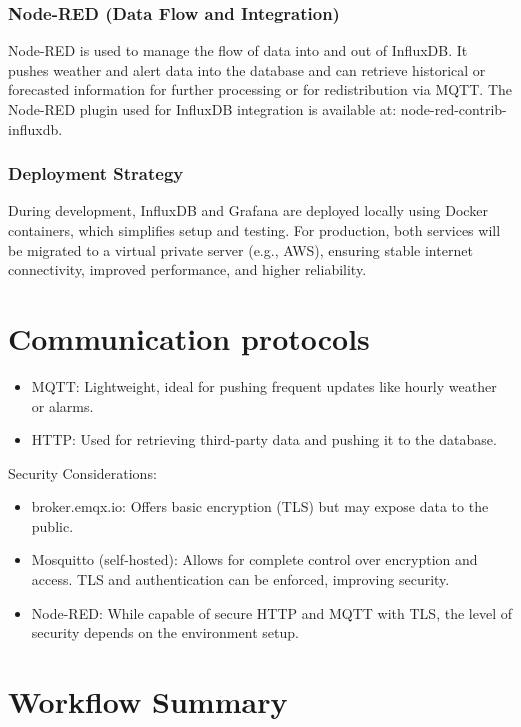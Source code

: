 \documentclass[11pt]{article}
\begin{document}
\subsubsection{Node-RED (Data Flow and Integration)}
Node-RED is used to manage the flow of data into and out of InfluxDB. It pushes weather and alert data into the database and can retrieve historical or forecasted information for further processing or for redistribution via MQTT. The Node-RED plugin used for InfluxDB integration is available at: node-red-contrib-influxdb\cite{nodered_influxdb_2025}.

\subsubsection{Deployment Strategy}
During development, InfluxDB and Grafana are deployed locally using Docker containers, which simplifies setup and testing. For production, both services will be migrated to a virtual private server (e.g., AWS), ensuring stable internet connectivity, improved performance, and higher reliability.


\section{Communication protocols}

\begin{itemize}
    \item MQTT: Lightweight, ideal for pushing frequent updates like hourly weather or alarms.
    \item HTTP: Used for retrieving third-party data and pushing it to the database.
\end{itemize}

Security Considerations:
\begin{itemize}
    \item broker.emqx.io: Offers basic encryption (TLS) but may expose data to the public.
    \item Mosquitto (self-hosted): Allows for complete control over encryption and access. TLS and authentication can be enforced, improving security.
    \item Node-RED: While capable of secure HTTP and MQTT with TLS, the level of security depends on the environment setup.
\end{itemize}




\section{Workflow Summary}
\end{document}
